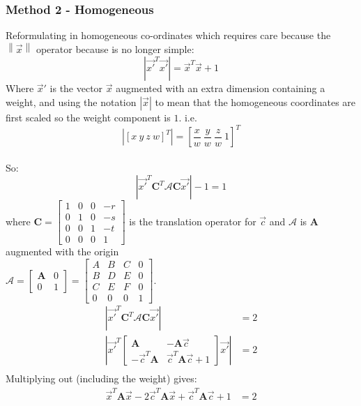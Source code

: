 \documentclass{article}
\def\mat#1{\mathbf{#1}}
\begin{document}
\subsubsection{Method 2 - Homogeneous}
Reformulating in homogeneous co-ordinates which requires care because the $\left\|
\vec{x} \right\|$ operator because is no longer simple: 
\begin{equation}
\left| \vec{x'}^T\vec{x'} \right| = \vec{x}^T \vec{x} + 1
\end{equation}
Where $\vec{x}'$ is the vector $\vec{x}$ augmented with an extra dimension
containing a weight, and using the notation $\left|\vec{x}\right|$ to mean 
that the homogeneous coordinates are
first scaled so the weight component is $1$. i.e. 
\begin{equation*}
\left| \left[ x ~ y ~ z ~ w \right]^T \right| = 
\left[ \frac{x}{w} ~ \frac{y}{w} ~ \frac{z}{w}
~ {1} \right]^T
\end{equation*}
\\
So:
\begin{equation} \left| \vec{x'}^T\mat{C}^T \mathcal{A}\mat{C} \vec{x'} \right| -1 = 1
\end{equation}
where $\mat{C}=\left[\begin{smallmatrix}
1 & 0 & 0 & -r\\ 0 & 1 & 0 & -s\\ 0 & 0 & 1 & -t\\ 0 & 0 & 0 & 1
\end{smallmatrix} \right]$ is the translation operator for $\vec{c}$ and $\mathcal{A}$ is
$\mat{A}$ augmented with the origin\\
$\mathcal{A}= \left[\begin{array}{c|c}
\mat{A} & 0 \\ \hline 0 & 1 \end{array}\right] = \left[\begin{smallmatrix}
A & B & C & 0\\ B & D & E & 0\\ C & E & F & 0\\ 0 & 0 & 0 & 1
\end{smallmatrix} \right]$.
%
\begin{equation}
\begin{split}
\left| \vec{x'}^T\mat{C}^T \mathcal{A} \mat{C} \vec{x'}\right| &= 2\\
\left|\vec{x'}^T\left[\begin{array}{c|c}
\mat{A} & -\mat{A}\vec{c} \\ 
\hline
-\vec{c}^T\mat{A} & \vec{c}^T \mat{A} \vec{c}+1 
\end{array} \right]\vec{x'} \right| &= 2 \\
\end{split}
\end{equation}
Multiplying out (including the weight) gives:
\begin{equation}
\begin{split}
\vec{x}^T \mat{A}\vec{x} - 2\vec{c}^T\mat{A}\vec{x} + \vec{c}^T\mat{A}\vec{c} + 1 &= 2\\
\end{split}
\end{equation}
%
\end{document}
